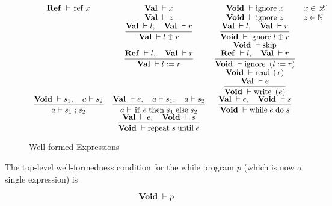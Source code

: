 \documentclass{article}
\newcommand{\trule}[2]{\dfrac{#1}{#2}}
\newcommand{\withenv}[2]{{#1}\vdash{#2}}
\newcommand{\llang}[1]{\mbox{\lstinline[mathescape]|#1|}}
\theoremstyle{definition}
\begin{document}
\begin{figure}
\renewcommand{\arraystretch}{2}
\[
  \begin{array}{cccl}
    \withenv{\Ref}{\llang{ref $\;x$}} & \withenv{\Val}{x}& \withenv{\Void}{\llang{ignore $\;x$}} & x \in \mathscr X\\
                                      & \withenv{\Val}{z}& \withenv{\Void}{\llang{ignore $\;z$}} & z \in \mathbb N \\
                                      & \trule{\withenv{\Val}{l},\quad\withenv{\Val}{r}}
                                              {\withenv{\Val}{l\oplus r}} &
                                        \trule{\withenv{\Val}{l},\quad\withenv{\Val}{r}}
                                              {\withenv{\Void}{\llang{ignore $\;l\oplus r$}}}    & \\
                                      &                  & \withenv{\Void}{\llang{skip}}         & \\
                                      & \trule{\withenv{\Ref}{l},\quad\withenv{\Val}{r}}
                                              {\withenv{\Val}{\llang{$l\;$ := $\; r$}}} &
                                        \trule{\withenv{\Ref}{l},\quad\withenv{\Val}{r}}
                                              {\withenv{\Void}{\llang{ignore ($l\;$ := $\; r$})}} & \\
                                      &                  & \withenv{\Void}{\llang{read ($x$)}} & \\
                                      &                  & \trule{\withenv{\Val}{e}}{\withenv{\Void}{\llang{write ($e$)}}} & \\[2mm]
      \trule{\withenv{\Void}{s_1},\quad\withenv{a}{s_2}}{\withenv{a}{\llang{$s_1\;$;$\;s_2$}}}&
      \trule{\withenv{\Val}{e},\quad\withenv{a}{s_1},\quad\withenv{a}{s_2}}{\withenv{a}{\llang{if $\;e\;$ then $\;s_1\;$ else $\;s_2$}}}&
      \trule{\withenv{\Val}{e},\quad\withenv{\Void}{s}}{\withenv{\Void}{\llang{while $\;e\;$ do $\;s$}}}&       \\[2mm]
       & \trule{\withenv{\Val}{e},\quad\withenv{\Void}{s}}{\withenv{\Void}{\llang{repeat $\;s\;$ until $\;e$}}} & &
  \end{array}
  \]
  \caption{Well-formed Expressions}
  \label{well_formed}
\end{figure}

The top-level well-formedness condition for the while program $p$ (which is now a single expression) is

\[
\withenv{\Void}{p}
\]
\end{document}
